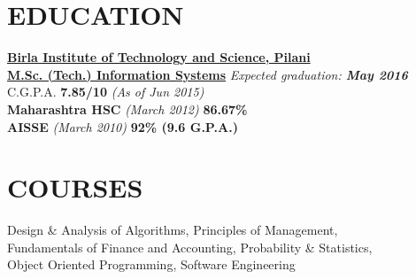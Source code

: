 \documentclass[margin]{res}
\begin{document}
\begin{resume}                        
 

\section{EDUCATION}       \textbf{\href{http://www.bits-pilani.ac.in/goa/}{Birla Institute of Technology and Science, Pilani}} \\
                \textbf{\href{http://www.bits-pilani.ac.in/goa/ComputerScienceInformationsSystems/ComputerScienceandInformationSystems}{M.Sc. (Tech.) Information Systems}}
                 \textit{Expected graduation: \textbf{May 2016} }\\
                C.G.P.A. \textbf{7.85/10} \textit{(As of Jun 2015)}\\
                \textbf {Maharashtra HSC} \textit{(March 2012)} \textbf {86.67\%} \\ \textbf{AISSE} \textit{(March 2010)} \textbf{92\% (9.6 G.P.A.)}
                
\section{COURSES}
                Design \& Analysis of Algorithms, Principles of Management, \\Fundamentals of Finance and Accounting, Probability \& Statistics, \\Object Oriented Programming, Software Engineering
 
 

\end{resume}
\end{document}
